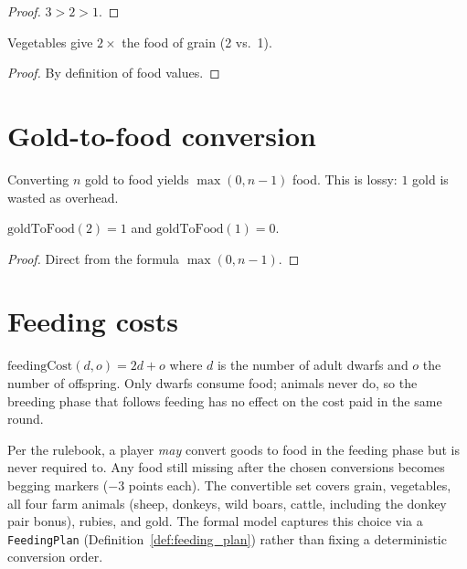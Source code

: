 \begin{proof}\leanok $3 > 2 > 1$.\end{proof}

\begin{theorem}
  \label{thm:veg_over_grain}
  \leanok
  Vegetables give $2\times$ the food of grain (2 vs.\ 1).
\end{theorem}

\begin{proof}\leanok By definition of food values.\end{proof}

\section{Gold-to-food conversion}

\begin{definition}
  \label{def:gold_food}
  \leanok
  Converting $n$ gold to food yields $\max(0, n-1)$ food.
  This is lossy: $1$ gold is wasted as overhead.
\end{definition}

\begin{theorem}
  \label{thm:gold_lossy}
  \leanok
  $\text{goldToFood}(2) = 1$ and $\text{goldToFood}(1) = 0$.
\end{theorem}

\begin{proof}\leanok Direct from the formula $\max(0, n-1)$.\end{proof}

\section{Feeding costs}

\begin{definition}
  \label{def:feeding_cost}
  \leanok
  $\text{feedingCost}(d, o) = 2d + o$ where $d$ is the number of
  adult dwarfs and $o$ the number of offspring.  Only dwarfs consume
  food; animals never do, so the breeding phase that follows feeding
  has no effect on the cost paid in the same round.
\end{definition}

\begin{remark}
  \label{rem:feeding_choice}
  \leanok
  Per the rulebook, a player \emph{may} convert goods to food in the
  feeding phase but is never required to.  Any food still missing
  after the chosen conversions becomes begging markers ($-3$ points
  each).  The convertible set covers grain, vegetables, all four farm
  animals (sheep, donkeys, wild boars, cattle, including the donkey
  pair bonus), rubies, and gold.  The formal model captures this
  choice via a \texttt{FeedingPlan} (Definition~\ref{def:feeding_plan})
  rather than fixing a deterministic conversion order.
\end{remark}

